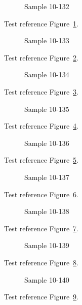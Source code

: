 \begin{figure}[tbhp]
\caption{Sample 10-132}
\label{fig:sample-10-132}
\end{figure}

Test reference Figure~\ref{fig:sample-10-132}.

\begin{figure}[tbhp]
\caption{Sample 10-133}
\label{fig:sample-10-133}
\end{figure}

Test reference Figure~\ref{fig:sample-10-133}.

\begin{figure}[tbhp]
\caption{Sample 10-134}
\label{fig:sample-10-134}
\end{figure}

Test reference Figure~\ref{fig:sample-10-134}.

\begin{figure}[tbhp]
\caption{Sample 10-135}
\label{fig:sample-10-135}
\end{figure}

Test reference Figure~\ref{fig:sample-10-135}.

\begin{figure}[tbhp]
\caption{Sample 10-136}
\label{fig:sample-10-136}
\end{figure}

Test reference Figure~\ref{fig:sample-10-136}.

\begin{figure}[tbhp]
\caption{Sample 10-137}
\label{fig:sample-10-137}
\end{figure}

Test reference Figure~\ref{fig:sample-10-137}.

\begin{figure}[tbhp]
\caption{Sample 10-138}
\label{fig:sample-10-138}
\end{figure}

Test reference Figure~\ref{fig:sample-10-138}.

\begin{figure}[tbhp]
\caption{Sample 10-139}
\label{fig:sample-10-139}
\end{figure}

Test reference Figure~\ref{fig:sample-10-139}.

\begin{figure}[tbhp]
\caption{Sample 10-140}
\label{fig:sample-10-140}
\end{figure}

Test reference Figure~\ref{fig:sample-10-140}.

